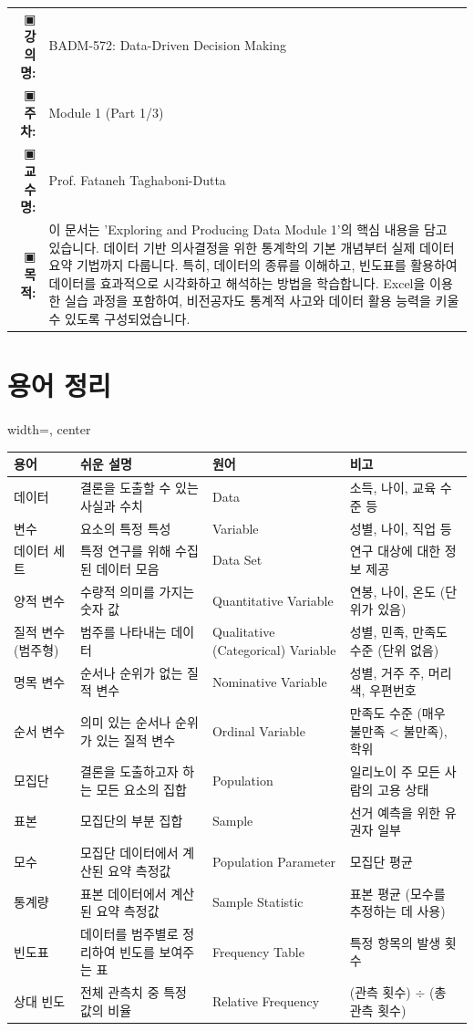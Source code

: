 \documentclass[11pt,a4paper]{article}
\makeatletter
\theoremstyle{definition}
\newcommand{\metainfo}[4]{
\begin{tcolorbox}[
    colback=lightpurple,
    colframe=darkpurple,
    boxrule=1pt,
    arc=2mm,
    left=10pt,
    right=10pt,
    top=8pt,
    bottom=8pt
]
\begin{tabular}{@{}rl@{}}
▣ \textbf{강의명:} & #1 \\[0.3em]
▣ \textbf{주차:} & #2 \\[0.3em]
▣ \textbf{교수명:} & #3 \\[0.3em]
▣ \textbf{목적:} & \begin{minipage}[t]{0.75\textwidth}#4\end{minipage}
\end{tabular}
\end{tcolorbox}
}
\makeatother
\begin{document}
\thispagestyle{firstpage}

\metainfo{BADM-572: Data-Driven Decision Making}{Module 1 (Part 1/3)}{Prof. Fataneh Taghaboni-Dutta}{이 문서는 'Exploring and Producing Data Module 1'의 핵심 내용을 담고 있습니다. 데이터 기반 의사결정을 위한 통계학의 기본 개념부터 실제 데이터 요약 기법까지 다룹니다. 특히, 데이터의 종류를 이해하고, 빈도표를 활용하여 데이터를 효과적으로 시각화하고 해석하는 방법을 학습합니다. Excel을 이용한 실습 과정을 포함하여, 비전공자도 통계적 사고와 데이터 활용 능력을 키울 수 있도록 구성되었습니다.}

\tableofcontents

\newpage

\section{용어 정리}

\begin{adjustbox}{width=\textwidth, center}
\begin{tabular}{llll}
\toprule
\textbf{용어} & \textbf{쉬운 설명} & \textbf{원어} & \textbf{비고} \\
\midrule
데이터 & 결론을 도출할 수 있는 사실과 수치 & Data & 소득, 나이, 교육 수준 등 \\
변수 & 요소의 특정 특성 & Variable & 성별, 나이, 직업 등 \\
데이터 세트 & 특정 연구를 위해 수집된 데이터 모음 & Data Set & 연구 대상에 대한 정보 제공 \\
양적 변수 & 수량적 의미를 가지는 숫자 값 & Quantitative Variable & 연봉, 나이, 온도 (단위가 있음) \\
질적 변수 (범주형) & 범주를 나타내는 데이터 & Qualitative (Categorical) Variable & 성별, 민족, 만족도 수준 (단위 없음) \\
명목 변수 & 순서나 순위가 없는 질적 변수 & Nominative Variable & 성별, 거주 주, 머리색, 우편번호 \\
순서 변수 & 의미 있는 순서나 순위가 있는 질적 변수 & Ordinal Variable & 만족도 수준 (매우 불만족 < 불만족), 학위 \\
모집단 & 결론을 도출하고자 하는 모든 요소의 집합 & Population & 일리노이 주 모든 사람의 고용 상태 \\
표본 & 모집단의 부분 집합 & Sample & 선거 예측을 위한 유권자 일부 \\
모수 & 모집단 데이터에서 계산된 요약 측정값 & Population Parameter & 모집단 평균 \\
통계량 & 표본 데이터에서 계산된 요약 측정값 & Sample Statistic & 표본 평균 (모수를 추정하는 데 사용) \\
빈도표 & 데이터를 범주별로 정리하여 빈도를 보여주는 표 & Frequency Table & 특정 항목의 발생 횟수 \\
상대 빈도 & 전체 관측치 중 특정 값의 비율 & Relative Frequency & (관측 횟수) $\div$ (총 관측 횟수) \\
\bottomrule
\end{tabular}
\end{adjustbox}
\end{document}
